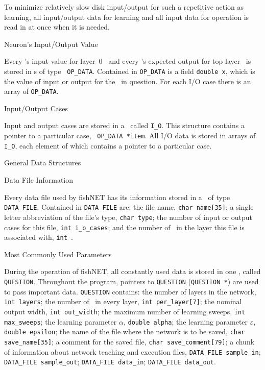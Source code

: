 To minimize relatively slow disk input/output for such a repetitive
action as learning, all input/output data for learning and all input
data for operation is read in at once when it is needed.

\sssec Neuron's Input/Output Value

Every \neu's input value for layer~$0$ \neus\ and every \neu's
expected
output for top layer \neus\ is stored in \struct s of type {\tt
OP\_DATA}.
Contained in {\tt OP\_DATA} is a field {\tt double x}, which is the
value of input or output for the \neu\ in question.
For each I/O case there is an array of {\tt OP\_DATA}.

\sssec Input/Output Cases

Input and output cases are stored in a \struct\ called {\tt I\_O}.
This structure contains a pointer to a particular case, {\tt
OP\_DATA *item}.
All I/O data is stored in arrays of {\tt I\_O}, each element of
which contains a pointer to a particular case.

\ssec General Data Structures

\sssec Data File Information

Every data file used by fishNET has its information stored in a
\struct\ of type {\tt DATA\_FILE}.
Contained in {\tt DATA\_FILE} are: the file name, {\tt char name[35]};
a single letter abbreviation of the file's type, {\tt char type};
the number of input or output cases for this file, {\tt int
i\_o\_cases}; and the number of \neus\ in the layer this file is
associated with, {\tt int \neus}.

\sssec Most Commonly Used Parameters

During the operation of fishNET, all constantly used data is stored
in one \struct, called {\tt QUESTION}.
Throughout the program, pointers to {\tt QUESTION} ({\tt QUESTION *}) 
are used to pass important data.
{\tt QUESTION} contains: the number of layers in the network,
{\tt int layers}; the number of \neus\ in every layer, {\tt int
per\_layer[7]}; the nominal output width, {\tt int out\_width};
the maximum number of learning sweeps, {\tt int max\_sweeps};
the learning parameter $\alpha$, {\tt double alpha};
the learning parameter $\varepsilon$, {\tt double epsilon};
the name of the file where the network is to be saved, {\tt char
save\_name[35]};
a comment for the saved file, {\tt char save\_comment[79]};
a chunk of information about network teaching and execution files,
{\tt DATA\_FILE sample\_in};
{\tt DATA\_FILE sample\_out};
{\tt DATA\_FILE data\_in};
{\tt DATA\_FILE data\_out}.

